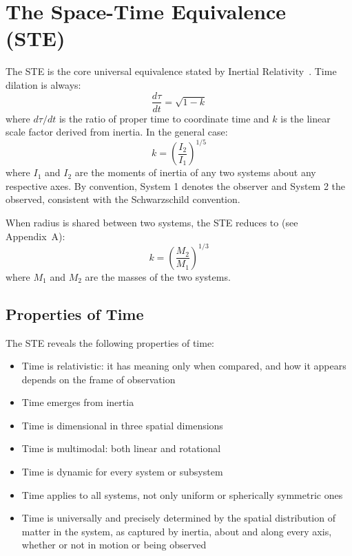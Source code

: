 \documentclass[a4paper,11pt]{article}
\begin{document}
\section{The Space-Time Equivalence (STE)}
The STE is the core universal equivalence stated by Inertial Relativity~\cite{degerlia2025universe}. Time dilation is always:
\begin{equation} \label{eq:td_k}
\frac{d\tau}{dt} = \sqrt{1 - k}
\end{equation}
where $d\tau/dt$ is the ratio of proper time to coordinate time and $k$ is the linear scale factor derived from inertia. In the general case:
\begin{equation} \label{eq:ste}
k = \left(\frac{I_2}{I_1}\right)^{1/5}
\end{equation}
where $I_1$ and $I_2$ are the moments of inertia of any two systems about any respective axes. By convention, System 1 denotes the observer and System 2 the observed, consistent with the Schwarzschild convention.

When radius is shared between two systems, the STE reduces to (see Appendix~A):
\begin{equation} \label{eq:linear}
k = \left(\frac{M_2}{M_1}\right)^{1/3}
\end{equation}
where $M_1$ and $M_2$ are the masses of the two systems.

\subsection{Properties of Time}
The STE reveals the following properties of time:
\begin{itemize}
\item Time is relativistic: it has meaning only when compared, and how it appears depends on the frame of observation
\item Time emerges from inertia
\item Time is dimensional in three spatial dimensions
\item Time is multimodal: both linear and rotational
\item Time is dynamic for every system or subsystem
\item Time applies to all systems, not only uniform or spherically symmetric ones
\item Time is universally and precisely determined by the spatial distribution of matter in the system, as captured by inertia, about and along every axis, whether or not in motion or being observed
\end{itemize}
\end{document}
